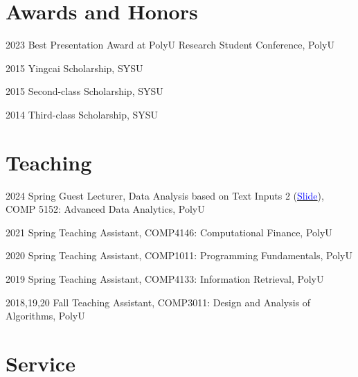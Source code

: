\documentclass[12pt,letterpaper]{report}
\begin{document}

    \section*{Awards and Honors}
    \begin{tablist}
        \item[2023] \tab{}Best Presentation Award at PolyU Research Student Conference, PolyU
        \item[2015] \tab{}Yingcai Scholarship, SYSU
        \item[2015] \tab{}Second-class Scholarship, SYSU
        \item[2014] \tab{}Third-class Scholarship, SYSU
    \end{tablist}

    \section*{Teaching}
    \begin{tablist}
        \item[2024 Spring] \tab{}Guest Lecturer, Data Analysis based on Text Inputs 2 (\href{https://preke.github.io/files/COMP5152-Lecture\%209.pdf}{\textcolor{blue}{Slide}}),\\ COMP 5152: Advanced Data Analytics, PolyU
        \item[2021 Spring] \tab{}Teaching Assistant, COMP4146: Computational Finance, PolyU
        \item[2020 Spring] \tab{}Teaching Assistant, COMP1011: Programming Fundamentals, PolyU
        \item[2019 Spring] \tab{}Teaching Assistant, COMP4133: Information Retrieval, PolyU
        \item[2018,19,20 Fall] \tab{}Teaching Assistant, COMP3011: Design and Analysis of Algorithms, PolyU
        
    \end{tablist}

    \section*{Service}
\end{document}
